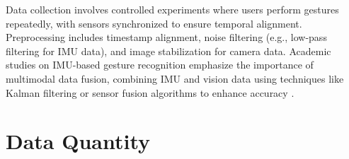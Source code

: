 \begin{figure}[H]\centering



	\label{fig:Slope Gesture}

\end{figure}



Data collection involves controlled experiments where users perform gestures repeatedly, with sensors synchronized to ensure temporal alignment. Preprocessing includes timestamp alignment, noise filtering (e.g., low-pass filtering for IMU data), and image stabilization for camera data. Academic studies on IMU-based gesture recognition emphasize the importance of multimodal data fusion, combining IMU and vision data using techniques like Kalman filtering or sensor fusion algorithms to enhance accuracy \cite{Starlino:2011,Din:2020}.



\section{Data Quantity}

